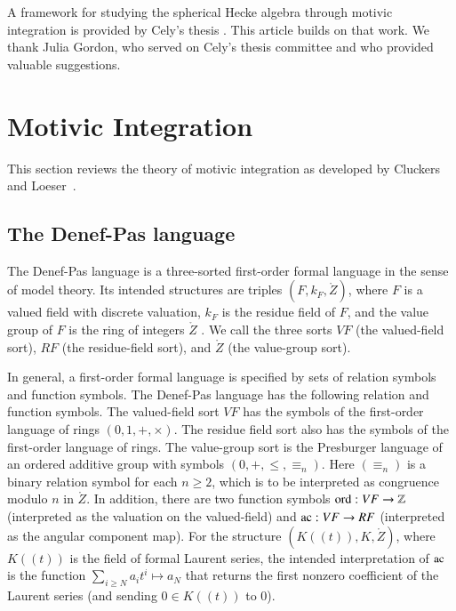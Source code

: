 A framework for studying the spherical Hecke algebra through motivic integration is provided by Cely's thesis \cite{cely}.
This article builds on that work.  We thank Julia Gordon, who served on Cely's thesis committee and who provided valuable suggestions.


\section{Motivic Integration}

This section reviews the theory of motivic integration as developed by Cluckers and
Loeser~\cite{cluckers2008constructible}.  

\subsection{The Denef-Pas language}

The Denef-Pas language is a three-sorted first-order formal language in the sense of model theory.  
Its intended structures are triples $(F,k_F,\ring{Z})$, 
where $F$ is a valued field with discrete valuation, 
$k_F$ is the residue field of $F$, 
and the value group of $F$ is the ring of integers $\ring{Z}$ . 
We call the three sorts $VF$ (the valued-field sort), $RF$ (the residue-field sort), and $\ring{Z}$ (the value-group sort).

In general, a first-order formal language is specified by sets of relation symbols and function symbols.
The Denef-Pas language has the following relation and function symbols.  
The valued-field sort $VF$ has the symbols of the first-order language of rings $(0,1,+,\times)$.  
The residue field sort also has the symbols of the first-order language of rings.  
The value-group sort is the Presburger language of an ordered additive group with symbols $(0,+,\le,\equiv_n)$.  
Here $(\equiv_n)$ is a binary relation symbol for each $n\ge 2$, which is to be interpreted as congruence modulo $n$ in $\ring{Z}$.
In addition, there are two function symbols ${\operatorname{ord}}:VF\to\mathbb{Z}$ (interpreted as the valuation on the valued-field) and ${\operatorname{ac}}:VF\to RF$ 
(interpreted as the angular component map).  
For the structure $(K((t)),K,\ring{Z})$, where $K((t))$ is the field of formal Laurent series, 
the intended interpretation of ${\operatorname{ac}}$ 
is the function $\sum_{i\ge N} a_i t^i\mapsto a_N$ 
that returns the first nonzero coefficient of the Laurent series (and sending $0\in K((t))$ to $0$).

